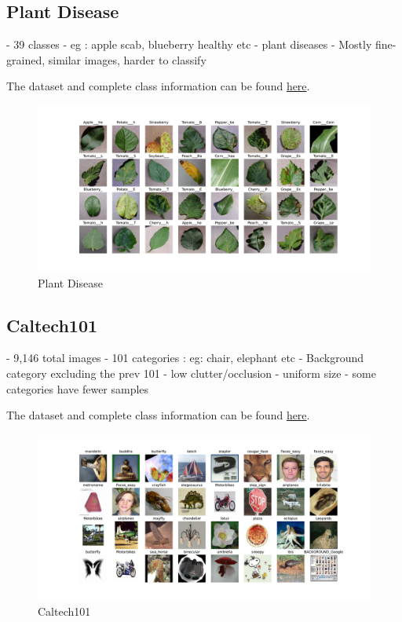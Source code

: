 \subsection{Plant Disease}
- 39 classes - eg : apple scab, blueberry healthy etc
- plant diseases
- Mostly fine-grained, similar images, harder to classify

The dataset and complete class information can be found \href{https://www.kaggle.com/datasets/rajibdpi/plant-disease-dataset}{here}.
\begin{figure}[H]
	\centering
	\includegraphics[width=1\textwidth]{images/plantdisease.pdf}
	\caption{Plant Disease}
	\label{fig:plant}

\end{figure}

\subsection{Caltech101}
\cite{li_andreeto_ranzato_perona_2022}
- 9,146 total images
- 101 categories : eg: chair, elephant etc
- Background category excluding the prev 101
- low clutter/occlusion
- uniform size
- some categories have fewer samples

The dataset and complete class information can be found \href{https://www.kaggle.com/datasets/862ae86edba271c39f76d0b530edeb55076b4b82b971160637210900747c44b1}{here}.
\begin{figure}[H]
	\centering
	\includegraphics[width=1\textwidth]{images/caltech101.pdf}
	\caption{Caltech101}
	\label{fig:calt}
\end{figure}


